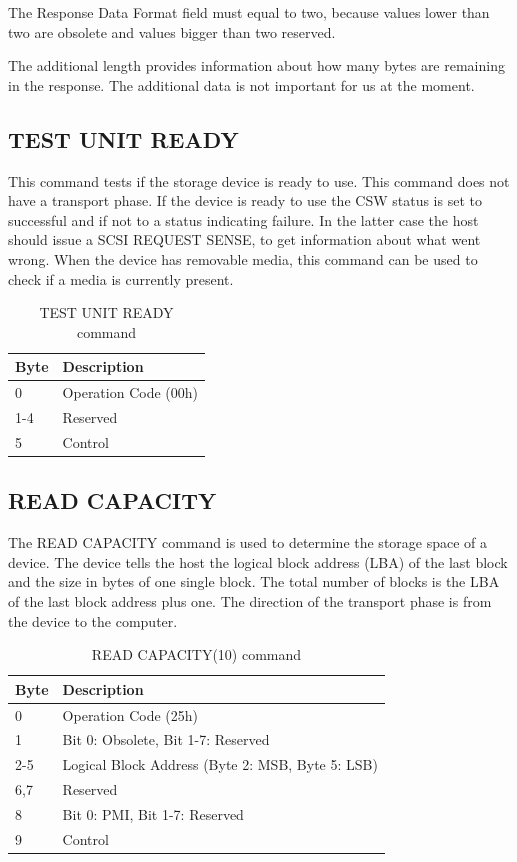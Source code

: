 The Response Data Format field must equal to two, because values lower than two are obsolete and values bigger than two reserved\cite{scsi_seagate}.

The additional length provides information about how many bytes are remaining in the response. The additional data is not important for us at the moment.

\subsection{TEST UNIT READY}

This command tests if the storage device is ready to use. This command does not have a transport phase. If the device is ready to use the CSW status is set to successful and if not to a status indicating failure. In the latter case the host should issue a SCSI REQUEST SENSE, to get information about what went wrong. When the device has removable media, this command can be used to check if a media is currently present\cite{usb_ms_jan}.

\begin{table}[ht]
\caption{TEST UNIT READY command \cite{scsi_seagate}}
\centering
\begin{tabular}{|l|l|}
\hline\hline
\textbf{Byte} & \textbf{Description}\\ \hline
0 & Operation Code (00h)\\ \hline
1-4 & Reserved \\ \hline
5 & Control \\ \hline
\end{tabular}
\label{table:unit_ready}
\end{table}

\subsection{READ CAPACITY}

The READ CAPACITY command is used to determine the storage space of a device. The device tells the host the logical block address (LBA) of the last block and the size in bytes of one single block. The total number of blocks is the LBA of the last block address plus one. The direction of the transport phase is from the device to the computer.

\begin{table}[ht]
\caption{READ CAPACITY(10) command \cite{scsi_seagate}}
\centering
\begin{tabular}{|l|l|}
\hline\hline
\textbf{Byte} & \textbf{Description}\\ \hline
0 & Operation Code (25h)\\ \hline
1 & Bit 0: Obsolete, Bit 1-7: Reserved \\ \hline
2-5 & Logical Block Address (Byte 2: MSB, Byte 5: LSB) \\ \hline
6,7 & Reserved \\ \hline
8 & Bit 0: PMI, Bit 1-7: Reserved \\ \hline
9 & Control \\ \hline
\end{tabular}
\label{table:read_capacity}
\end{table}


